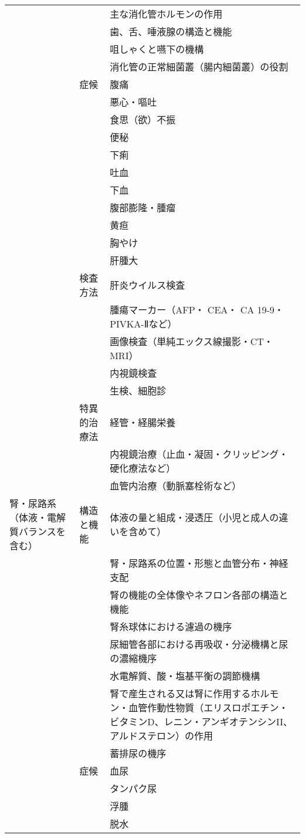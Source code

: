 \begin{xltabular}{\linewidth}{XXX}
 &  & 主な消化管ホルモンの作用 \\
 &  & 歯、舌、唾液腺の構造と機能 \\
 &  & 咀しゃくと嚥下の機構 \\
 &  & 消化管の正常細菌叢（腸内細菌叢）の役割 \\
 & 症候 & 腹痛 \\
 &  & 悪心・嘔吐 \\
 &  & 食思（欲）不振 \\
 &  & 便秘 \\
 &  & 下痢 \\
 &  & 吐血 \\
 &  & 下血 \\
 &  & 腹部膨隆・腫瘤 \\
 &  & 黄疸 \\
 &  & 胸やけ \\
 &  & 肝腫大 \\
 & 検査方法 & 肝炎ウイルス検査 \\
 &  & 腫瘍マーカー（AFP・ CEA・ CA 19-9・ PIVKA-Ⅱなど） \\
 &  & 画像検査（単純エックス線撮影・CT・MRI） \\
 &  & 内視鏡検査 \\
 &  & 生検、細胞診 \\
 & 特異的治療法 & 経管・経腸栄養 \\
 &  & 内視鏡治療（止血・凝固・クリッピング・硬化療法など） \\
 &  & 血管内治療（動脈塞栓術など） \\
腎・尿路系（体液・電解質バランスを含む） & 構造と機能 & 体液の量と組成・浸透圧（小児と成人の違いを含めて） \\
 &  & 腎・尿路系の位置・形態と血管分布・神経支配 \\
 &  & 腎の機能の全体像やネフロン各部の構造と機能 \\
 &  & 腎糸球体における濾過の機序 \\
 &  & 尿細管各部における再吸収・分泌機構と尿の濃縮機序 \\
 &  & 水電解質、酸・塩基平衡の調節機構 \\
 &  & 腎で産生される又は腎に作用するホルモン・血管作動性物質（エリスロポエチン・ビタミンD、レニン・アンギオテンシンII、アルドステロン）の作用 \\
 &  & 蓄排尿の機序 \\
 & 症候 & 血尿 \\
 &  & タンパク尿 \\
 &  & 浮腫 \\
 &  & 脱水 \\

\end{xltabular}
